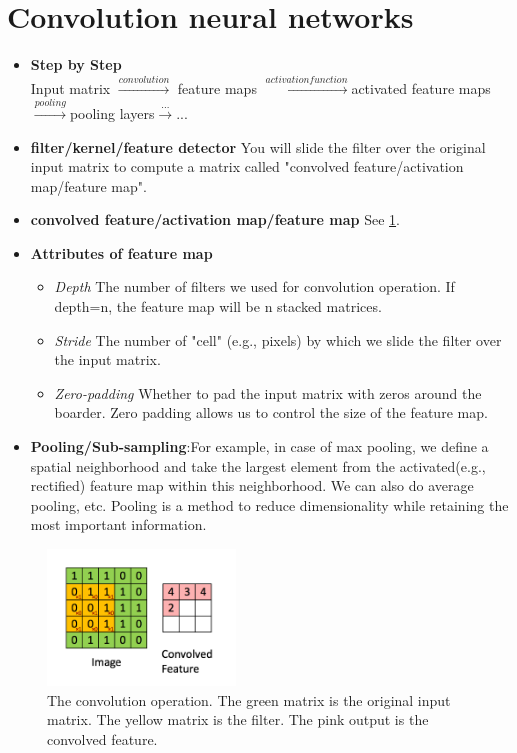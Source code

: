 \section{Convolution neural networks}
\begin{itemize}
    \item \textbf{Step by Step}\\
    Input matrix $\xrightarrow{convolution}$ feature maps $\xrightarrow{activation function}$activated feature maps\\ $\xrightarrow{pooling}$pooling layers$\xrightarrow{...}$...
    \item \textbf{filter/kernel/feature detector} You will slide the filter over the original input matrix to compute a matrix called "convolved feature/activation map/feature map".
    \item \textbf{convolved feature/activation map/feature map} See \ref{fig:cnn1}.
    \item \textbf{Attributes of feature map} 
    \begin{itemize}
        \item \textit{Depth} The number of filters we used for convolution operation. If depth=n, the feature map will be n stacked matrices.  
        \item \textit{Stride} The number of "cell" (e.g., pixels) by which we slide the filter over the input matrix. 
        \item \textit{Zero-padding} Whether to pad the input matrix with zeros around the boarder. Zero padding allows us to control the size of the feature map.  
    \end{itemize}
    \item \textbf{Pooling/Sub-sampling}:For example, in case of max pooling, we define a spatial neighborhood and take the largest element from the activated(e.g., rectified) feature map within this neighborhood. We can also do average pooling, etc. Pooling is a method to reduce dimensionality while retaining the most important information.
\end{itemize}
    \begin{figure}[h]
        \centering
        \includegraphics[width=5cm]{figures/CNN1.png}
        \caption{The convolution operation. The green matrix is the original input matrix. The yellow matrix is the filter. The pink output is the convolved feature.}
        \label{fig:cnn1}
    \end{figure}


